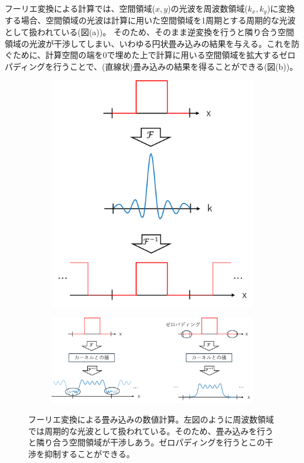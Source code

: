 \documentclass[a4paper,11pt,uplatex]{jsbook}
\begin{document}
フーリエ変換による計算では、空間領域($x,y$)の光波を周波数領域($k_x,k_y$)に変換する場合、空間領域の光波は計算に用いた空間領域を1周期とする周期的な光波として扱われている(図(a))。
そのため、そのまま逆変換を行うと隣り合う空間領域の光波が干渉してしまい、いわゆる円状畳み込みの結果を与える。これを防ぐために、計算空間の端を0で埋めた上で計算に用いる空間領域を拡大するゼロパディングを行うことで、(直線状)畳み込みの結果を得ることができる(図(b))。
\begin{figure}
  \centering
  \begin{subfigure}[h]{0.3\linewidth}
    \centering
    \includegraphics[width=\linewidth]{image/4-ft.png}
  \end{subfigure}
  \hfill
  \begin{subfigure}[h]{0.65\linewidth}
    \centering
    \includegraphics[width=\linewidth]{image/4-ft_zeropadding.png}
  \end{subfigure}
  \caption[フーリエ変換による畳み込みの数値計算]{フーリエ変換による畳み込みの数値計算。左図のように周波数領域では周期的な光波として扱われている。そのため、畳み込みを行うと隣り合う空間領域が干渉しあう。ゼロパディングを行うとこの干渉を抑制することができる。}
\end{figure}\label{ft}
\end{document}
